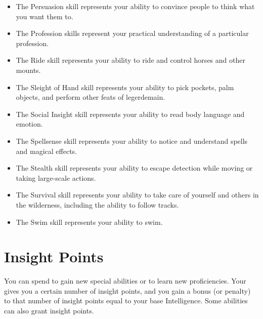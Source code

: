 \begin{itemize}
        \item The Persuasion skill represents your ability to convince people to think what you want them to.
        \item The Profession skills represent your practical understanding of a particular profession.
        \item The Ride skill represents your ability to ride and control horses and other mounts.
        \item The Sleight of Hand skill represents your ability to pick pockets, palm objects, and perform other feats of legerdemain.
        \item The Social Insight skill represents your ability to read body language and emotion.
        \item The Spellsense skill represents your ability to notice and understand spells and magical effects.
        \item The Stealth skill represents your ability to escape detection while moving or taking large-scale actions.
        \item The Survival skill represents your ability to take care of yourself and others in the wilderness, including the ability to follow tracks.
        \item The Swim skill represents your ability to swim.
    \end{itemize}

\section{Insight Points}\label{Insight Points}
    You can spend  to gain new special abilities or to learn new proficiencies.
    Your  gives you a certain number of insight points, and you gain a bonus (or penalty) to that number of insight points equal to your base Intelligence.
    Some abilities can also grant insight points.

